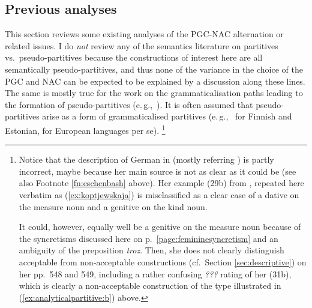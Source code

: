 \documentclass[USenglish]{article}
\newcommand{\eg}{e.\,g.,}
\begin{document}
\subsection{Previous analyses}
\label{sec:analyses}

This section reviews some existing analyses of the PGC-NAC alternation or related issues.
I do \textit{not} review any of the semantics literature on partitives vs.\ pseudo-partitives because the constructions of interest here are all semantically pseudo-partitives, and thus none of the variance in the choice of the PGC and NAC can be expected to be explained by a discussion along these lines.
The same is mostly true for the work on the grammaticalisation paths leading to the formation of pseudo-partitives (\eg\ \citealp{Brems2003,DeclerckBrems2016,Koptjevskaja2001,Rutkowski2007}).
It is often assumed that pseudo-partitives arise as a form of grammaticalised partitives (\eg\ \citealp[536--539]{Koptjevskaja2001} for Finnish and Estonian, \citealp[559]{Koptjevskaja2001} for European languages per se).%
\footnote{Notice that the description of German in \cite[547--549]{Koptjevskaja2001} (mostly referring \citealp{Eschenbach1993}) is partly incorrect, maybe because her main source \cite{Eschenbach1993} is not as clear as it could be (see also Footnote \ref{fn:eschenbash} above).
Her example (29b) from \cite[71]{Eschenbach1993}, repeated here verbatim as (\ref{ex:koptjewskaja}) is misclassified as a clear case of a dative on the measure noun and a genitive on the kind noun.

\begin{exe}
\end{exe}

It could, however, equally well be a genitive on the measure noun because of the syncretisms discussed here on p.\ \ref{page:femininesyncretism} and an ambiguity of the preposition \textit{troz}.
Then, she does not clearly distinguish acceptable from non-acceptable constructions (cf.\ Section \ref{sec:descriptive}) on her pp.\ 548 and 549, including a rather confusing \textit{???} rating of her (31b), which is clearly a non-acceptable construction of the type illustrated in (\ref{ex:analyticalpartitive:b}) above.
}


\end{document}
